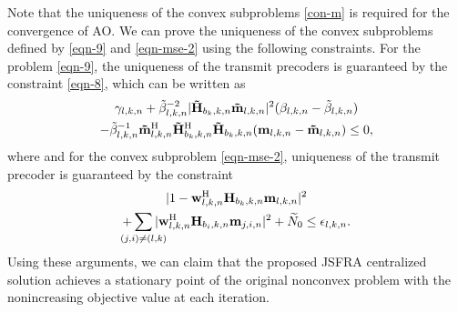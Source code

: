 Note that the uniqueness of the convex subproblems \eqref{con-m} is required for the convergence of \ac{AO}. We can prove the uniqueness of the convex subproblems defined by \eqref{eqn-9} and \eqref{eqn-mse-2} using the following constraints. For the problem \eqref{eqn-9}, the uniqueness of the transmit precoders is guaranteed by the constraint \eqref{eqn-8}, which can be written as
\begin{multline}
\gamma_{l,k,n} + \tilde{\beta}_{l,k,n}^{-2} |\mathbf{\tilde{H}}_{b_k,k,n} \mathbf{\tilde{m}}_{l,k,n}|^2 (\beta_{l,k,n} - \tilde{\beta}_{l,k,n}) \\
- \tilde{\beta}_{l,k,n}^{-1} \mathbf{\tilde{m}}_{l,k,n}^{\mathrm{H}} \mathbf{\tilde{H}}_{b_k,k,n}^{\mathrm{H}} \mathbf{\tilde{H}}_{b_k,k,n} (\mathbf{m}_{l,k,n} - \mathbf{\tilde{m}}_{l,k,n}) \leq 0,
\end{multline}
where  and for the convex subproblem \eqref{eqn-mse-2}, uniqueness of the transmit precoder is guaranteed by the constraint 
\begin{multline}
| 1 - \mvec{w}{l,k,n}^\herm \mvec{H}{b_k,k,n} \mvec{m}{l,k,n} |^2 \\ + \sum_{\mathclap{(j,i) \neq (l,k)}} | \mvec{w}{l,k,n}^\herm \mvec{H}{b_i,k,n} \mvec{m}{j,i,n} |^2 + \enoise \leq \epsilon_{l,k,n}.
\end{multline}
Using these arguments, we can claim that the proposed \ac{JSFRA} centralized solution achieves a stationary point of the original nonconvex problem with the nonincreasing objective value at each iteration. 










